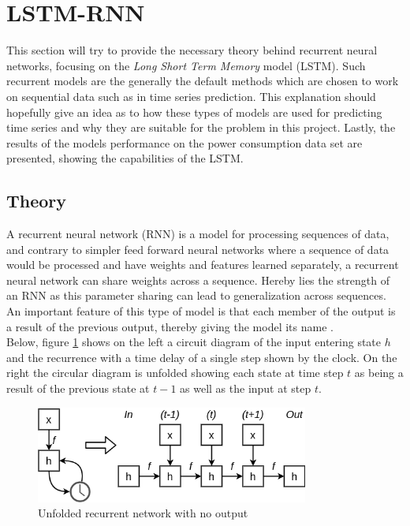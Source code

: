 \documentclass[main.tex]{subfiles}
\begin{document}
\section{LSTM-RNN}
This section will try to provide the necessary theory behind recurrent neural networks, focusing on the \textit{Long Short Term Memory} model (LSTM). Such recurrent models are the generally the default methods which are chosen to work on sequential data such as in time series prediction. This explanation should hopefully give an idea as to how these types of models are used for predicting time series and why they are suitable for the problem in this project. Lastly, the results of the models performance on the power consumption data set are presented, showing the capabilities of the LSTM. 

\subsection{Theory}
A recurrent neural network (RNN) is a model for processing sequences of data, and contrary to simpler feed forward neural networks where a sequence of data would be processed and have weights and features learned separately, a recurrent neural network can share weights across a sequence. Hereby lies the strength of an RNN as this parameter sharing can lead to generalization across sequences. An important feature of this type of model is that each member of the output is a result of the previous output, thereby giving the model its name \cite{Goodfellow-et-al-2016}. \\
Below, figure \ref{fig:RNN unfolded} shows on the left a circuit diagram of the input entering state \textit{$h$} and the recurrence with a time delay of a single step shown by the clock. On the right the circular diagram is unfolded showing each state at time step \textit{$t$} as being a result of the previous state at \textit{$t-1$} as well as the input at step \textit{$t$}.

\begin{figure}[H]
\centering
\includegraphics[width=0.8\textwidth]{Figures/rnnunfold.png}
\caption{Unfolded recurrent network with no output}
\label{fig:RNN unfolded}
\end{figure}
\end{document}

